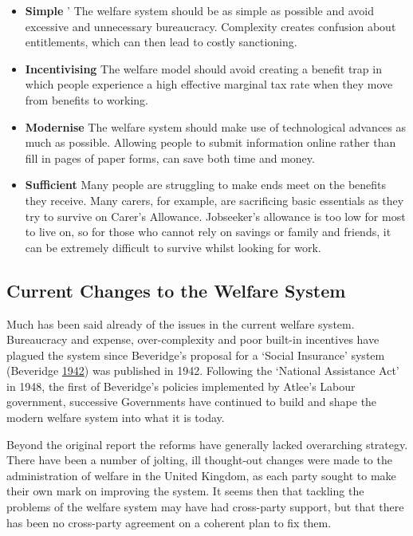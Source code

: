 \documentclass[]{tufte-handout}
\begin{document}
\begin{itemize}
\item
  \textbf{Simple} ' The welfare system should be as simple as possible
  and avoid excessive and unnecessary bureaucracy. Complexity creates
  confusion about entitlements, which can then lead to costly
  sanctioning.
\item
  \textbf{Incentivising} The welfare model should avoid creating a
  benefit trap in which people experience a high effective marginal tax
  rate when they move from benefits to working.
\item
  \textbf{Modernise} The welfare system should make use of technological
  advances as much as possible. Allowing people to submit information
  online rather than fill in pages of paper forms, can save both time
  and money.
\item
  \textbf{Sufficient} Many people are struggling to make ends meet on
  the benefits they receive. Many carers, for example, are sacrificing
  basic essentials as they try to survive on Carer's Allowance.
  Jobseeker's allowance is too low for most to live on, so for those who
  cannot rely on savings or family and friends, it can be extremely
  difficult to survive whilst looking for work.
\end{itemize}

\hypertarget{current-changes-to-the-welfare-system}{%
\subsection{Current Changes to the Welfare
System}\label{current-changes-to-the-welfare-system}}

Much has been said already of the issues in the current welfare system.
Bureaucracy and expense, over-complexity and poor built-in incentives
have plagued the system since Beveridge's proposal for a `Social
Insurance' system (Beveridge
\protect\hyperlink{ref-Beveridge1942}{1942}) was published in 1942.
Following the `National Assistance Act' in 1948, the first of
Beveridge's policies implemented by Atlee's Labour government,
successive Governments have continued to build and shape the modern
welfare system into what it is today.

Beyond the original report the reforms have generally lacked overarching
strategy. There have been a number of jolting, ill thought-out changes
were made to the administration of welfare in the United Kingdom, as
each party sought to make their own mark on improving the system. It
seems then that tackling the problems of the welfare system may have had
cross-party support, but that there has been no cross-party agreement on
a coherent plan to fix them.
\end{document}
